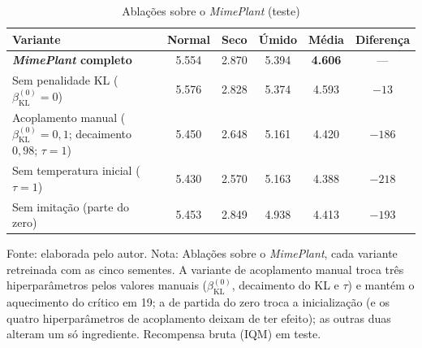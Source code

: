 \begin{table}[htbp]
\centering
\small\setlength{\tabcolsep}{2.5pt}
\caption{Ablações sobre o \textit{MimePlant} (teste)}
\label{tab:ablacoes}
\begin{tabular}{>{\raggedright\arraybackslash}p{6.4cm} c c c c c}
\hline
\textbf{Variante} & \textbf{Normal} & \textbf{Seco} & \textbf{Úmido} & \textbf{Média} & \textbf{Diferença} \\ \hline
\textbf{\textit{MimePlant} completo} & 5.554 & 2.870 & 5.394 & \textbf{4.606} & --- \\ \hline
Sem penalidade KL ($\beta_{\text{KL}}^{(0)}=0$) & 5.576 & 2.828 & 5.374 & 4.593 & $-13$ \\
Acoplamento manual ($\beta_{\text{KL}}^{(0)}=0{,}1$; decaimento $0{,}98$; $\tau=1$) & 5.450 & 2.648 & 5.161 & 4.420 & $-186$ \\
Sem temperatura inicial ($\tau=1$) & 5.430 & 2.570 & 5.163 & 4.388 & $-218$ \\
Sem imitação (parte do zero) & 5.453 & 2.849 & 4.938 & 4.413 & $-193$ \\
\hline
\end{tabular}

{\footnotesize Fonte: elaborada pelo autor. Nota: Ablações sobre o \textit{MimePlant}, cada variante retreinada com as cinco sementes. A variante de acoplamento manual troca três hiperparâmetros pelos valores manuais ($\beta_{\text{KL}}^{(0)}$, decaimento do KL e $\tau$) e mantém o aquecimento do crítico em 19; a de partida do zero troca a inicialização (e os quatro hiperparâmetros de acoplamento deixam de ter efeito); as outras duas alteram um só ingrediente. Recompensa bruta (IQM) em teste.}
\end{table}
